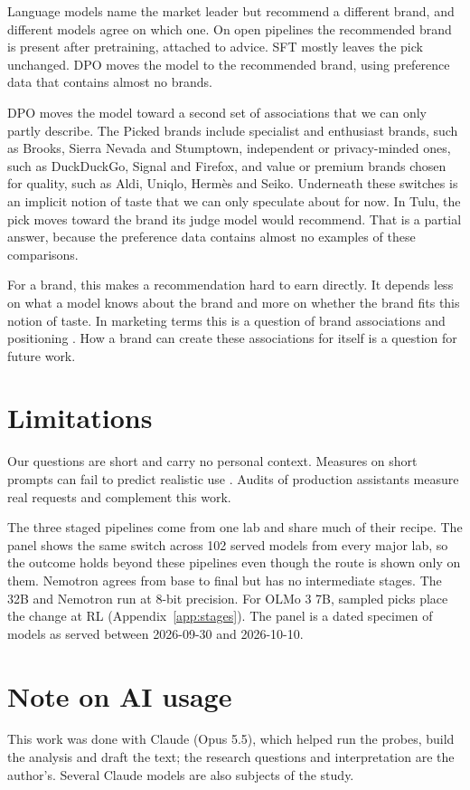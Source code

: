 \documentclass[11pt]{article}
\begin{document}
Language models name the market leader but recommend a different brand, and different models agree on which one. On
open pipelines the recommended brand is present after pretraining, attached to advice. SFT mostly leaves the pick
unchanged.
DPO moves the model to the recommended brand, using preference data that contains almost no brands.

DPO moves the model toward a second set of associations that we can only partly describe. The Picked brands include
specialist and enthusiast brands, such as Brooks, Sierra Nevada and Stumptown, independent or privacy-minded ones,
such as DuckDuckGo, Signal and Firefox, and value or premium brands chosen for quality, such as Aldi, Uniqlo, Hermès
and Seiko. Underneath these switches is an implicit notion of taste that we can only speculate about for now. In Tulu,
the pick moves toward the brand its judge model would recommend. That is a partial answer, because the preference data
contains almost no examples of these comparisons.

For a brand, this makes a recommendation hard to earn directly. It depends less on what a model knows about the brand
and more on whether the brand fits this notion of taste. In marketing terms this is a question of brand associations
and positioning \citep{keller1993equity,aaker1997personality}. How a brand can create
these associations for itself is a question for future work.

\section{Limitations}
\label{sec:limits}

Our questions are short and carry no personal context. Measures on short prompts can fail to predict realistic use
\citep{lum2025trick}. Audits of production assistants measure real requests and complement this work.

The three staged pipelines come from one lab and share much of their recipe. The panel shows the same switch across
102 served models from every major lab, so the outcome holds beyond these pipelines even though the route is shown
only on them. Nemotron agrees from base to final but has no intermediate stages. The 32B and Nemotron run at 8-bit
precision. For OLMo 3 7B, sampled picks place the change at RL (Appendix~\ref{app:stages}). The panel is a dated
specimen of models as served between 2026-09-30 and 2026-10-10.


\section*{Note on AI usage}
This work was done with Claude (Opus 5.5), which helped run the probes, build the analysis and
draft the text; the research questions and interpretation are the author's. Several Claude
models are also subjects of the study.
\end{document}
